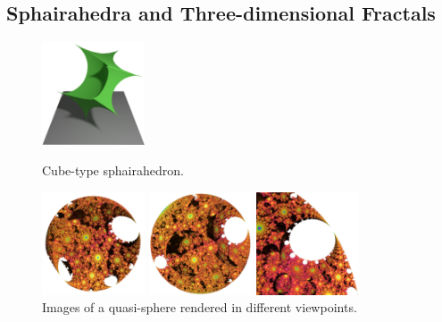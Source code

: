 \subsection{Sphairahedra and Three-dimensional Fractals}

\begin{figure}[h!tbp]
  \begin{minipage}[t]{0.25\textwidth}
   \centering
   \includegraphics[height=1.2in, keepaspectratio]{./img/application/sphairahedron/cube.png}
   \caption{Cube-type sphairahedron.}
   \label{fig:cubeSphaira}
  \end{minipage}
  \hspace*{\fill}
 \begin{minipage}[t]{0.75\textwidth}
  \begin{minipage}[t]{0.25\textwidth}
   \centering
   \includegraphics[height=1.2in,
   keepaspectratio]{./img/application/sphairahedron/quasi-sphere.png}
   \subcaption{}
  \end{minipage}
  \hspace*{\fill}
  \begin{minipage}[t]{0.25\textwidth}
   \centering
   \includegraphics[height=1.2in,
   keepaspectratio]{./img/application/sphairahedron/other.png}
   \subcaption{}
  \end{minipage}
  \hspace*{\fill}
  \begin{minipage}[t]{0.25\textwidth}
   \centering
   \includegraphics[height=1.2in,
   keepaspectratio]{./img/application/sphairahedron/quasi-sphereZoom.png}
   \subcaption{}
  \end{minipage}
  \hspace*{\fill}
  \caption{Images of a quasi-sphere rendered in different viewpoints.}
  \label{fig:quasi-sphere}
 \end{minipage}
\end{figure}


